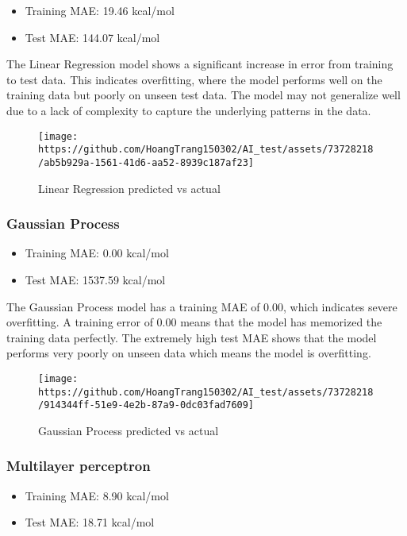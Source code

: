 \documentclass{article}
\begin{document}
\begin{itemize}
\tightlist
\item
  Training MAE: 19.46 kcal/mol
\item
  Test MAE: 144.07 kcal/mol
\end{itemize}

The Linear Regression model shows a significant increase in error from
training to test data. This indicates overfitting, where the model
performs well on the training data but poorly on unseen test data. The
model may not generalize well due to a lack of complexity to capture the
underlying patterns in the data.

\begin{figure}
\centering
\texttt{[image: https://github.com/HoangTrang150302/AI\_test/assets/73728218/ab5b929a-1561-41d6-aa52-8939c187af23]}
\caption{Linear Regression predicted vs actual}
\end{figure}

\subsubsection{Gaussian Process}\label{gaussian-process}

\begin{itemize}
\tightlist
\item
  Training MAE: 0.00 kcal/mol
\item
  Test MAE: 1537.59 kcal/mol
\end{itemize}

The Gaussian Process model has a training MAE of 0.00, which indicates
severe overfitting. A training error of 0.00 means that the model has
memorized the training data perfectly. The extremely high test MAE shows
that the model performs very poorly on unseen data which means the model
is overfitting.

\begin{figure}
\centering
\texttt{[image: https://github.com/HoangTrang150302/AI\_test/assets/73728218/914344ff-51e9-4e2b-87a9-0dc03fad7609]}
\caption{Gaussian Process predicted vs actual}
\end{figure}

\subsubsection{Multilayer perceptron}\label{multilayer-perceptron}

\begin{itemize}
\tightlist
\item
  Training MAE: 8.90 kcal/mol
\item
  Test MAE: 18.71 kcal/mol
\end{itemize}
\end{document}
